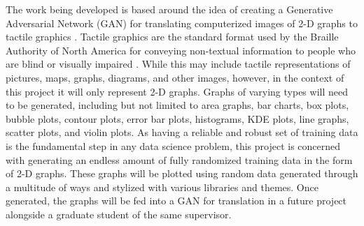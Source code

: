 The work being developed is based around the idea of creating a Generative Adversarial Network (GAN) for translating computerized images of 2-D graphs to tactile graphics \cite{goodfellow2014generative}. Tactile graphics are the standard format used by the Braille Authority of North America for conveying non-textual information to people who are blind or visually impaired \cite{tactile_graphics}. While this may include tactile representations of pictures, maps, graphs, diagrams, and other images, however, in the context of this project it will only represent 2-D graphs. Graphs of varying types will need to be generated, including but not limited to area graphs, bar charts, box plots, bubble plots, contour plots, error bar plots, histograms, KDE plots, line graphs, scatter plots, and violin plots. As having a reliable and robust set of training data is the fundamental step in any data science problem, this project is concerned with generating an endless amount of fully randomized training data in the form of 2-D graphs. These graphs will be plotted using random data generated through a multitude of ways and stylized with various libraries and themes. Once generated, the graphs will be fed into a GAN for translation in a future project alongside a graduate student of the same supervisor.